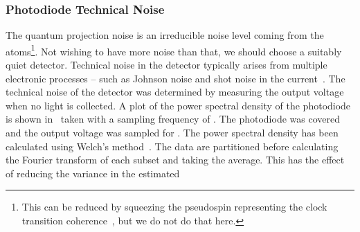 \subsubsection{Photodiode Technical Noise}
The quantum projection noise is an irreducible noise level coming from
the atoms\footnote{This can be reduced by squeezing the pseudospin
  representing the clock transition coherence~\cite{Bollinger1996},
but we do not do that here.}. Not wishing to have more noise than
that, we should choose a suitably quiet detector. 
Technical noise in the detector typically arises from multiple electronic processes -- such as Johnson noise and shot noise in
the current~\cite{Howard2002}. The technical noise of the detector was determined by measuring the output voltage when no light is
collected. A plot of the power spectral density of the photodiode is
shown in~ taken
with a sampling frequency of . The
photodiode was covered and the output voltage was sampled for
. The power spectral density has been calculated
using Welch's method~\cite{Welch1967}. The data are partitioned before
calculating the Fourier transform of each subset and taking the
average. This has the effect of reducing the variance in the estimated
